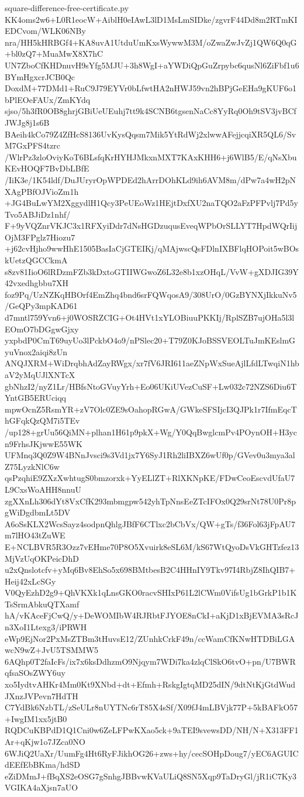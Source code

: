 \documentclass[11pt]{article}
\theoremstyle{definition}
\theoremstyle{remark}
\begin{document}
\begin{filecontents*}[overwrite]{square-difference-free-certificate.py}
KK4oms2w6+L0R1eocW+AiblH0eIAwL3lD1MsLmSIDke/zgvrF44Dd8m2RTmKIEDCvom/WLK06NBy
nra/HH5kHRBGf4+KA8uvA1UtduUmKxsWywwM3M/oZwaZwJvZj1QW6Q0qG+bl0zQ7+MuaMwX8X7hC
UN7ZboCfKHDnuvH9sYfg5MJU+3h8WgI+aYWDiQpGuZrpybc6qusNl6ZiFbf1u6BYmHgxcrJCB0Qc
DoxdM+77DMd1+RuC9J79EYVr0bLfwtHA2nHWJ59vn2hBPjGeEHa9gKUF6o1bPlEOeFAUx/ZmKYdq
sjso/5h3fR0OB8ghrjGBiUeUEuhj7tt9k4SCNB6tgsenNaCc8YyRq0Oh9tSV3jvBCfJWJg8j1s6B
BAeih4kCo79Z4ZfHcS8136UvKysQqsm7Mik5YtRdWj2xlwwAFejjcqiXR5QL6/SvM7GxPFS4tzrc
/WlrPz3zloOviyKoT6BLsfqKrHYHJMkxnMXT7KAxKHH6+j6WlB5/E/qNsXbuKEvHOQF7BvDbLBfE
/IiK3e/1K54ldf/DuJUryrOpWPDEd2hArrDOhKLd9ih6AVM8m/dPw7a4wH2pNXAgPBfOJVioZm1h
+JG4BuLwYM2XggydlH1Qcy3PeUEoWz1HEjtDxfXU2naTQO2aFzPFPvlj7Pd5yTvo5ABJiDz1nhf/
F+9yVQZnrVKJC3x1RFXyiDdr7dNsHGDzuqusEveqWPbOrSLLYT7HpdWQrIijOjM3FPglz7Hiozu7
+j62cvHjho9wwHhE1505BasIaCjGTEIKj/qMAjwscQsFDlnIXBFlqHOPoit5wBOskUetzQGCCkmA
s8zv81IioO6lRDzmFZb3kDxtoGTIIWGwoZ6L32e8b1xzOHqL/VvW+gXDJIG39Y42vxedhgbbu7XH
foz9Pq/UzNZKqHBOrf4EmZhq4bnd6srFQWqosA9/308UrO/0GzBYNXjIkkuNv5/GeQPy3mpKAD61
d7mntl759Yvn6+j0WOSRZCIG+Ot4HVt1xYLOBiuuPKKIj/RplSZB7ujOHa5l3lEOmO7bDGgwGjxy
yxpbdP0CmT69uyUo3lPckbO4o9/nPSlec20+T79Z0KJoBSSVEOLTuJmKEslmGyuVnox2aiqi8zUn
ANQJXRM+WiDrqbhAdZayRWgx/xr7fV6JRI611aeZNpWxSueAjlLfdLTwqiN1hbaV2yMqUJlXNTcX
gbNhzI2/nyZ1Lr/HBfsNtoGVuyYrh+Eo06UKiUVezCuSF+Lw032c72NZS6Diu6TYntGB5ERUciqq
mpwOcnZ5RsmYR+zV7Olc0ZE9sOahopRGwA/GWkeSFSIjcI3QJPk1r7IfmEqcThGFqkQzQM7i5TEv
/up128+grUu56QiMN+plhan1H61p9pkX+Wg/Y0QqBwglcmPv4POynOH+H3ycn9FrhsJKjwwE55WK
UFMnq3Q0Z9W4BNnJvsci9s3Vd1jx7Y6SyJ1Rh2liIBXZ6wUf0p/GVev0u3mya3alZ75LyzkNlC6w
qsPzqhiE9ZXzXwhtugS0bmzorxk+YyELlZT+RlXKNpKE/FDwCeoEscvdUfaU7L9CxsWoAHH8nnuU
zgXXnLh306dYt8VxCfK293mbmgpw542yhTpNnsEeZTcIFOx0Q29srNt78U0Pr8pgWiDgdbmLt5DV
A6oSsKLX2WcsSayz4sodpnQhlgJBfF6CTlxc2bCbVx/QW+gTs/f36Fol63jFpAU7m7lHO43tZuWE
E+NCLBVR5R3Ozz7vEHme70P8O5Xvuirk8eSL6M/kS67WtQyoDsVkGHTzfez13MjVzUqOKPeicDhD
u2xQnslotcfv+yMq6Bv8EhSo5x698BMtbesB2C4HHnIY9Tkv97I4RbjZ8IhQIB7+Heij42xLcSGy
V0QyEzhD2g9+QhVKXk1qLnsGKO0racvSHIxP61L2lCWm0VifsUg1bGrkP1b1KTsSrmAbkuQTXamf
hA/vKAceFjCwQ/y+DeWOMIbW4RJRbtFJYOE8nCkI+aKjD1xBjEVMA3sRcJn3XoI1Ltexg3/iPRWH
eWp9EjNor2PxMsZTBm3tHuvsE12/ZUnhkCrkF49n/ccWamCfKNwHTDBiLGAwcN9wZ+JvU5TSMMW5
6AQhp0T2faIcFs/ix7x6ksDdhzmO9Njqym7WDi7ka4zlqClSkO6tvO+pn/U7BWRqfsaSOsZWY6uy
xo5IydtvAHKr4Mm0Kt9XNbd+dt+Efmh+RskgIgtqMD25dIN/9dtNtKjGtdWudJXnzJVPevn7HdTH
C7YdBk6NzbTL/zSeULr8nUYTNc6rT85X4sSf/X09fJ4mLBVjk77P+5kBAFkO57+IwgIM1xx5jtB0
RQDCuKBPdD1Q1Cni0w6ZeLFPwKXao5ck+9aTEI9svewsDD/NH/N+X313FF1Ar+qKjw1o7JZca0NO
6WJiQ2UaXr/UumFg4Ht6RyFJikhOG26+zws+hy/cecSOHpDoug7/yEC6AGUICdEEfEbBKma/hdSD
eZiDMmJ+fBqXS2eOSG7gSnhgJBBvwKVaULiQ8SN5Xqp9TaDryGl/jR1iC7Ky3VGIKA4aXjsn7aUO

\end{filecontents*}
\end{document}
